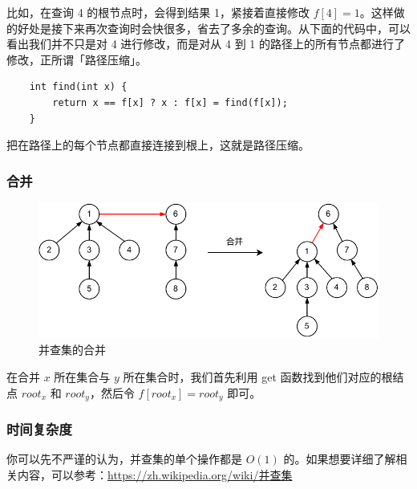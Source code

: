 \documentclass[12pt,a4paper]{article}
\begin{document}
比如，在查询 4 的根节点时，会得到结果 1，紧接着直接修改 $f[4] = 1$。这样做的好处是接下来再次查询时会快很多，省去了多余的查询。从下面的代码中，可以看出我们并不只是对 4 进行修改，而是对从 4 到 1 的路径上的所有节点都进行了修改，正所谓「路径压缩」。

\begin{lstlisting}
    int find(int x) {
        return x == f[x] ? x : f[x] = find(f[x]);
    }
\end{lstlisting}

把在路径上的每个节点都直接连接到根上，这就是路径压缩。

\subsubsection{合并}

\begin{figure}[h]
    \centering
    \includegraphics{img/lab6/并查集_union.pdf}
    \caption{并查集的合并}
    \label{fig:uf_union}
\end{figure}

在合并 $x$ 所在集合与 $y$ 所在集合时，我们首先利用 get 函数找到他们对应的根结点 $\textit{root}_x$ 和 $\textit{root}_y$，然后令 $f[\textit{root}_x] = \textit{root}_y$ 即可。

\subsubsection{时间复杂度}

你可以先不严谨的认为，并查集的单个操作都是 $O(1)$ 的。如果想要详细了解相关内容，可以参考：\href{https://zh.wikipedia.org/wiki/并查集}{https://zh.wikipedia.org/wiki/并查集}
\end{document}
